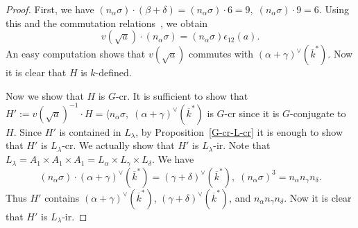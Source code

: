 \begin{proof}
First, we have 
$
(n_\alpha \sigma) \cdot (\beta+\delta) = (n_\alpha \sigma) \cdot 6 = 9, \;
(n_\alpha \sigma) \cdot 9 = 6.
$
Using this and the commutation relations~\cite[Lem.~32.5 and Prop.~33.3]{Humphreys-book1}, we obtain
\begin{equation*}
v(\sqrt a)\cdot (n_{\alpha}\sigma)=(n_\alpha \sigma) \epsilon_{12}(a).
\end{equation*}
An easy computation shows that $v(\sqrt a)$ commutes with $(\alpha+\gamma)^{\vee}(\overline k^*)$. Now it is clear that $H$ is $k$-defined. 

Now we show that $H$ is $G$-cr. It is sufficient to show that $H':=v(\sqrt a)^{-1}\cdot H=\langle n_\alpha \sigma,\; (\alpha+\gamma)^{\vee}(\overline k^*)$ is $G$-cr since it is $G$-conjugate to $H$. Since $H'$ is contained in $L_\lambda$, by Proposition~\ref{G-cr-L-cr} it is enough to show that $H'$ is $L_\lambda$-cr. We actually show that $H'$ is $L_\lambda$-ir. Note that $L_\lambda=A_1\times A_1 \times A_1=L_\alpha\times L_\gamma\times L_\delta$. We have 
\begin{equation*}
(n_\alpha \sigma)\cdot (\alpha+\gamma)^{\vee}(\overline k^*) = (\gamma+\delta)^{\vee}(\overline k^*),\;
(n_\alpha \sigma)^3 = n_\alpha n_\gamma n_\delta.
\end{equation*}  
Thus $H'$ contains $(\alpha+\gamma)^{\vee}(\overline k^*)$, $(\gamma+\delta)^{\vee}(\overline k^*)$, and $n_\alpha n_\gamma n_\delta$. Now it is clear that $H'$ is $L_\lambda$-ir. 


\end{proof}
